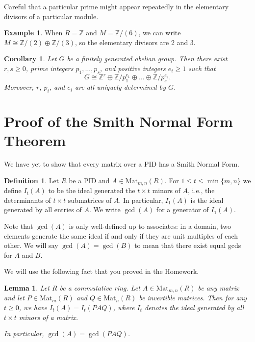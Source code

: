\documentclass[12pt]{report}
\newtheorem{lemma}[theorem]{Lemma}
\newtheorem{corollary}[theorem]{Corollary}
\numberwithin{equation}{section}
\numberwithin{theorem}{chapter}
\theoremstyle{definition}
\newtheorem{definition}[theorem]{Definition}
\newtheorem{example}[theorem]{Example}
\newtheorem*{basic properties}{Basic Properties}
\newtheorem*{Important Remark}{Important Remark}
\begin{document}
Careful that a particular prime might appear repeatedly in the elementary divisors of a particular module.

\begin{example}
When $R = \mathbb{Z}$ and $M = \mathbb{Z}/(6)$, we can write $M\cong \mathbb{Z}/(2)\oplus \mathbb{Z}/(3)$, so the elementary divisors are $2$ and $3$.
\end{example}


\begin{corollary}
Let $G$ be a finitely generated abelian group. Then there exist $r,s \geqslant 0$, prime integers $p_1, \ldots, p_s $, and positive integers $e_i \geqslant 1$ such that 
$$G \cong \mathbb{Z}^r\oplus \mathbb{Z}/p_1^{e_1} \oplus \dots \oplus \mathbb{Z}/p_s^{e_s}.$$
Moreover, $r$, $p_i$, and $e_i$ are all uniquely determined by $G$.
\end{corollary}


\section{Proof of the Smith Normal Form Theorem}



We have yet to show that every matrix over a PID has a Smith Normal Form.


\begin{definition}
Let $R$ be a PID and $A \in \mathrm{Mat}_{m,n}(R)$. For $1\leq t \leq \min\{m,n\}$ we define $I_t(A)$ to be the ideal generated the $t\times t$ minors of $A$, i.e., the determinants of $t\times t$ submatrices of $A$. In particular, $I_1(A)$ is the ideal generated by all entries of $A$. We write $\gcd(A)$ for a generator of $I_1(A)$.
\end{definition}

Note that $\gcd(A)$ is only well-defined up to associates: in a domain, two elements generate the same ideal if and only if they are unit multiples of each other. We will say $\gcd(A)=\gcd(B)$ to mean that there exist equal gcds for $A$ and $B$.

We will use the following fact that you proved in the Homework.
 
 \begin{lemma}
 Let $R$ be a commutative ring. Let $A \in \mathrm{Mat}_{m,n}(R)$ be any matrix and let $P \in \mathrm{Mat}_m(R)$ and $Q \in \mathrm{Mat}_n(R)$ be invertible matrices. Then for any $t\geq 0$, we have $I_t(A) = I_t(PAQ)$, where $I_t$ denotes the ideal generated by all $t\times t$ minors of a matrix.
 
 In particular, $\gcd(A) = \gcd(PAQ)$.
 \end{lemma}
 
\end{document}
